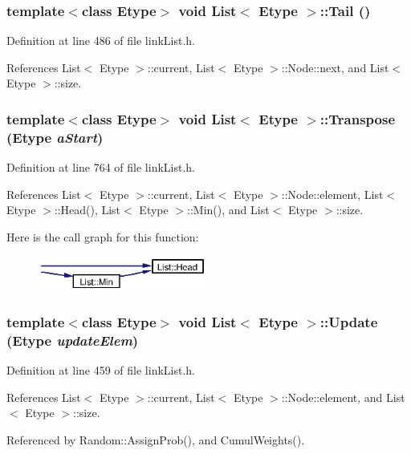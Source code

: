 \subsubsection{\setlength{\rightskip}{0pt plus 5cm}template$<$class Etype$>$ void {\bf List}$<$ Etype $>$::Tail ()}\label{classList_a12}




Definition at line 486 of file link\-List.h.

References List$<$ Etype $>$::current, List$<$ Etype $>$::Node::next, and List$<$ Etype $>$::size.
\subsubsection{\setlength{\rightskip}{0pt plus 5cm}template$<$class Etype$>$ void {\bf List}$<$ Etype $>$::Transpose (Etype {\em a\-Start})}\label{classList_a24}




Definition at line 764 of file link\-List.h.

References List$<$ Etype $>$::current, List$<$ Etype $>$::Node::element, List$<$ Etype $>$::Head(), List$<$ Etype $>$::Min(), and List$<$ Etype $>$::size.

Here is the call graph for this function:\begin{figure}[H]
\begin{center}
\leavevmode
\includegraphics[width=157pt]{classList_a24_cgraph}
\end{center}
\end{figure}
\subsubsection{\setlength{\rightskip}{0pt plus 5cm}template$<$class Etype$>$ void {\bf List}$<$ Etype $>$::Update (Etype {\em update\-Elem})}\label{classList_a10}




Definition at line 459 of file link\-List.h.

References List$<$ Etype $>$::current, List$<$ Etype $>$::Node::element, and List$<$ Etype $>$::size.

Referenced by Random::Assign\-Prob(), and Cumul\-Weights().

